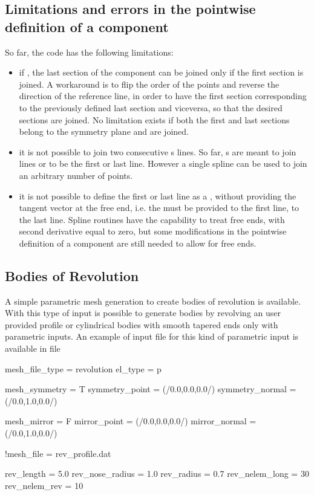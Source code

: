 \subsection{Limitations and errors in the pointwise definition of a component}
So far, the code has the following limitations:
\begin{itemize}
    \item if , the last section of the component can be joined only if the first section is joined. A workaround is to flip the order of the points and reverse the direction of the reference line, in order to have the first section corresponding to the previously defined last section and viceversa, so that the desired sections are joined. No limitation exists if both the first and last sections belong to the symmetry plane and are joined.
    
    \item it is not possible to join two consecutive s lines. So far, s are meant to join  lines or to be the first or last line. However a single spline can be used to join an arbitrary number of points. 
    
    \item it is not possible to define the first or last line as a , without providing the tangent vector at the free end, i.e. the  must be provided to the first line,  to the last line. Spline routines have the capability to treat free ends, with second derivative equal to zero, but some modifications in the pointwise definition of a component are still needed to allow for free ends.
    
\end{itemize}

\subsection{Bodies of Revolution}
\label{subs:Bodies_Revolution}
A simple parametric mesh generation to create bodies of revolution is available. With this type of input is possible to generate bodies by revolving an user provided profile or cylindrical bodies with smooth tapered ends only with parametric inputs. An example of input file for this kind of parametric input is available in file 

\begin{inputfile}[frame=single, caption={Boies of revolution geometry definition }, label={file:revolution_example_file.in}]
mesh_file_type = revolution
el_type = p

mesh_symmetry = T
symmetry_point = (/0.0,0.0,0.0/)
symmetry_normal = (/0.0,1.0,0.0/)

mesh_mirror = F
mirror_point = (/0.0,0.0,0.0/)
mirror_normal = (/0.0,1.0,0.0/)

!mesh_file = rev_profile.dat

rev_length = 5.0
rev_nose_radius = 1.0
rev_radius = 0.7
rev_nelem_long = 30
rev_nelem_rev = 10

\end{inputfile}

